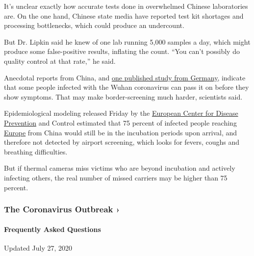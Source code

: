 It's unclear exactly how accurate tests done in overwhelmed Chinese
laboratories are. On the one hand, Chinese state media have reported
test kit shortages and processing bottlenecks, which could produce an
undercount.

But Dr. Lipkin said he knew of one lab running 5,000 samples a day,
which might produce some false-positive results, inflating the count.
``You can't possibly do quality control at that rate,'' he said.

Anecdotal reports from China, and
\href{https://www.scientificamerican.com/article/study-reports-first-case-of-coronavirus-spread-by-asymptomatic-person/}{one
published study from Germany}, indicate that some people infected with
the Wuhan coronavirus can pass it on before they show symptoms. That may
make border-screening much harder, scientists said.

Epidemiological modeling released Friday by the
\href{https://www.nytimes.com/2020/02/10/world/europe/coronavirus-europe.html}{European
Center for Disease Prevention} and Control estimated that 75 percent of
infected people reaching
\href{https://www.nytimes.com/2020/02/10/world/europe/coronavirus-europe.html}{Europe}
from China would still be in the incubation periods upon arrival, and
therefore not detected by airport screening, which looks for fevers,
coughs and breathing difficulties.

But if thermal cameras miss victims who are beyond incubation and
actively infecting others, the real number of missed carriers may be
higher than 75 percent.

\href{https://www.nytimes.com/news-event/coronavirus?action=click\&pgtype=Article\&state=default\&region=MAIN_CONTENT_3\&context=storylines_faq}{}

\hypertarget{the-coronavirus-outbreak-}{%
\subsubsection{The Coronavirus Outbreak
›}\label{the-coronavirus-outbreak-}}

\hypertarget{frequently-asked-questions}{%
\paragraph{Frequently Asked
Questions}\label{frequently-asked-questions}}

Updated July 27, 2020

